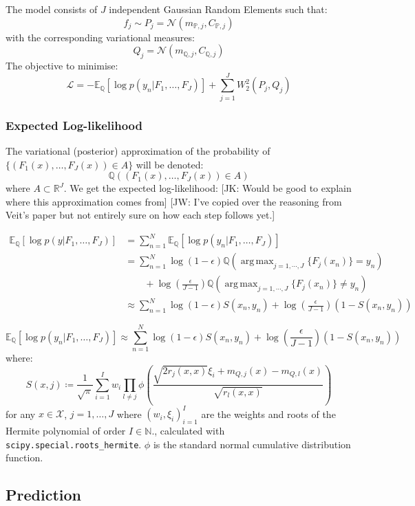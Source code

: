 \documentclass[twoside,11pt]{article}
\newcommand{\jk}[1]{{\color{blue} [JK: #1]}}
\newcommand{\jw}[1]{{\color{gray} [JW: #1]}}
\DeclareMathOperator*{\argmax}{arg\,max}
\begin{document}
The model consists of $J$ independent Gaussian Random Elements such that:
\[f_j \sim P_j = \mathcal{N}(m_{\mathbb{P}, j}, C_{\mathbb{P}, j})\]
with the corresponding variational measures:
\[Q_j = \mathcal{N}(m_{\mathbb{Q}, j}, C_{\mathbb{Q}, j})\]
The objective to minimise:
\[\mathcal{L} = -\mathbb{E}_{\mathbb{Q}}\left[ \log p(y_n | F_1, \dots, F_J)\right] + \sum_{j=1}^{J} W_2^2(P_j, Q_j)\]

\subsubsection{Expected Log-likelihood}\label{subsec:expected-log-likelihood}

The variational (posterior) approximation of the probability of $\{(F_1(x), \dots, F_J(x)) \in A\}$ will be denoted:
\[\mathbb{Q}\left( (F_1(x), \dots, F_J(x)) \in A\right)\]
where $A \subset \mathbb{R}^J$.
We get the expected log-likelihood:
%
\jk{Would be good to explain where this approximation comes from}
\jw{I've copied over the reasoning from Veit's paper but not entirely sure on how each step follows yet.}
%

\begin{align*}
\mathbb{E}_{\mathbb{Q}}\left[ \log p(y | F_1, \dots, F_J)\right] &= \sum_{n=1}^{N}\mathbb{E}_{\mathbb{Q}}\left[ \log p(y_n | F_1, \dots, F_J)\right]\\
&= \sum_{n=1}^{N}\log(1-\epsilon)\mathbb{Q}\left( \argmax_{j=1, \cdots, J} \{F_j(x_n)\} = y_n\right)\\
& \qquad + \log\left(\frac{\epsilon}{J-1}\right)\mathbb{Q}\left( \argmax_{j=1, \cdots, J} \{F_j(x_n)\} \neq y_n\right)\\
&\approx \sum_{n=1}^{N} \log(1-\epsilon)S(x_n, y_n) + \log \left(\frac{\epsilon}{J-1}\right)(1-S(x_n, y_n))
\end{align*}

\[\mathbb{E}_{\mathbb{Q}}\left[ \log p(y_n | F_1, \dots, F_J)\right] \approx \sum_{n=1}^{N} \log(1-\epsilon)S(x_n, y_n) + \log \left(\frac{\epsilon}{J-1}\right)(1-S(x_n, y_n))\]
where:
\[S(x, j) \coloneqq \frac{1}{\sqrt{\pi}} \sum_{i=1}^I w_i \prod_{l\neq j} \phi \left( \frac{\sqrt{2 r_j (x, x)}\xi_i + m_{Q, j}(x) - m_{Q, l}(x)}{\sqrt{r_l (x, x)}}\right)\]
for any $x \in \mathcal{X}$, $j=1, \dots, J$ where $(w_i, \xi_i)_{i=1}^I$ are the weights and roots of the Hermite polynomial of order $I \in \mathbb{N}$., calculated with \verb|scipy.special.roots_hermite|.
$\phi$ is the standard normal cumulative distribution function.

\subsection{Prediction}\label{subsec:gwi-for-multiclass-classification-prediction}
\end{document}
